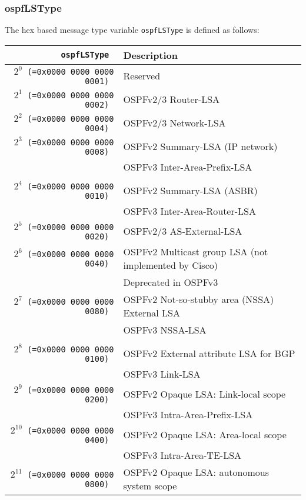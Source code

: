 \documentclass[documentation]{subfiles}
\begin{document}
\subsubsection{ospfLSType}\label{ospfLSType}
The hex based message type variable {\tt ospfLSType} is defined as follows:
\begin{longtable}{>{\tt}rl}
    \toprule
    {\bf ospfLSType}                  & {\bf Description} \\
    \midrule\endhead%
    $2^{0}$  (=0x0000 0000 0000 0001) & Reserved\\
    $2^{1}$  (=0x0000 0000 0000 0002) & OSPFv2/3 Router-LSA\\
    $2^{2}$  (=0x0000 0000 0000 0004) & OSPFv2/3 Network-LSA\\
    $2^{3}$  (=0x0000 0000 0000 0008) & OSPFv2 Summary-LSA (IP network)\\
                                      & OSPFv3 Inter-Area-Prefix-LSA\\
    \\
    $2^{4}$  (=0x0000 0000 0000 0010) & OSPFv2 Summary-LSA (ASBR)\\
                                      & OSPFv3 Inter-Area-Router-LSA\\
    $2^{5}$  (=0x0000 0000 0000 0020) & OSPFv2/3 AS-External-LSA\\
    $2^{6}$  (=0x0000 0000 0000 0040) & OSPFv2 Multicast group LSA (not implemented by Cisco)\\
                                      & Deprecated in OSPFv3\\
    $2^{7}$  (=0x0000 0000 0000 0080) & OSPFv2 Not-so-stubby area (NSSA) External LSA\\
                                      & OSPFv3 NSSA-LSA\\
    \\
    $2^{8}$  (=0x0000 0000 0000 0100) & OSPFv2 External attribute LSA for BGP\\
                                      & OSPFv3 Link-LSA\\
    $2^{9}$  (=0x0000 0000 0000 0200) & OSPFv2 Opaque LSA: Link-local scope\\
                                      & OSPFv3 Intra-Area-Prefix-LSA\\
    $2^{10}$ (=0x0000 0000 0000 0400) & OSPFv2 Opaque LSA: Area-local scope\\
                                      & OSPFv3 Intra-Area-TE-LSA\\
    $2^{11}$ (=0x0000 0000 0000 0800) & OSPFv2 Opaque LSA: autonomous system scope\\

\end{longtable}
\end{document}
